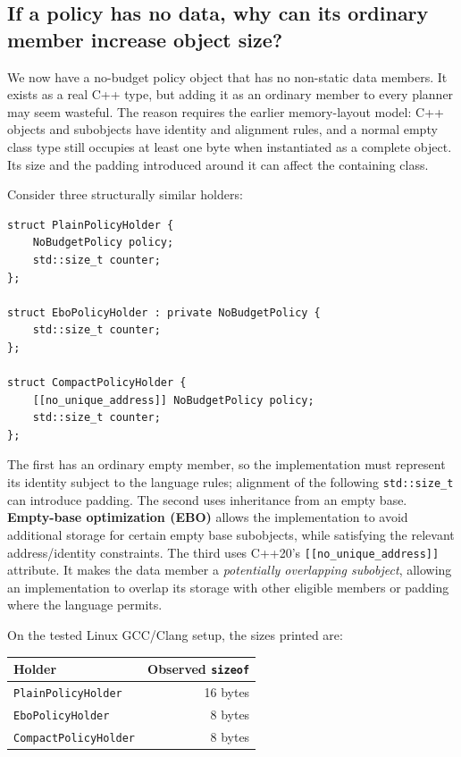 \subsection{If a policy has no data, why can its ordinary member increase object size?}\label{05-engine-i-ch005-if-a-policy-has-no-data-why-can-its-ordinary-member-increase-object-size}

We now have a no-budget policy object that has no non-static data members. It exists as a real C++ type, but adding it as an ordinary member to every planner may seem wasteful. The reason requires the earlier memory-layout model: C++ objects and subobjects have identity and alignment rules, and a normal empty class type still occupies at least one byte when instantiated as a complete object. Its size and the padding introduced around it can affect the containing class.

Consider three structurally similar holders:

\begin{verbatim}
struct PlainPolicyHolder {
    NoBudgetPolicy policy;
    std::size_t counter;
};

struct EboPolicyHolder : private NoBudgetPolicy {
    std::size_t counter;
};

struct CompactPolicyHolder {
    [[no_unique_address]] NoBudgetPolicy policy;
    std::size_t counter;
};
\end{verbatim}

The first has an ordinary empty member, so the implementation must represent its identity subject to the language rules; alignment of the following \texttt{std::size\_t} can introduce padding. The second uses inheritance from an empty base. \textbf{Empty-base optimization (EBO)} allows the implementation to avoid additional storage for certain empty base subobjects, while satisfying the relevant address/identity constraints. The third uses C++20's \texttt{{[}{[}no\_unique\_address{]}{]}} attribute. It makes the data member a \emph{potentially overlapping subobject}, allowing an implementation to overlap its storage with other eligible members or padding where the language permits.

On the tested Linux GCC/Clang setup, the sizes printed are:

{\def\LTcaptype{none} %
\begin{longtable}[]{@{}lr@{}}
\toprule\noalign{}
Holder & Observed \texttt{sizeof} \\
\midrule\noalign{}
\endhead
\bottomrule\noalign{}
\endlastfoot
\texttt{PlainPolicyHolder} & 16 bytes \\
\texttt{EboPolicyHolder} & 8 bytes \\
\texttt{CompactPolicyHolder} & 8 bytes \\
\end{longtable}
}

